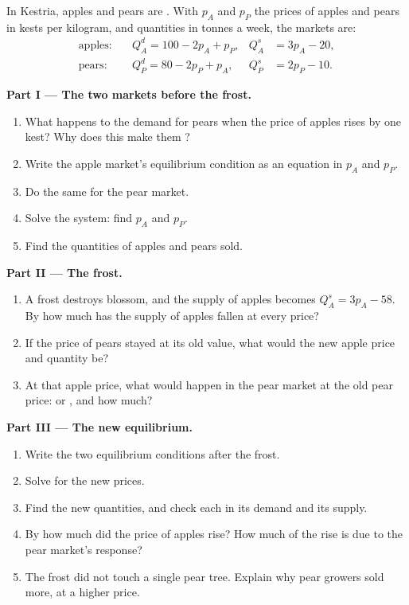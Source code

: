 \begin{problem}
\label{pb:g10:market-equilibrium:1}
In Kestria, apples and pears are . With $p_A$ and $p_P$ the prices of apples and pears in kests per kilogram, and quantities in
tonnes a week, the markets are:
\[
\begin{aligned}
  \text{apples:}\quad & Q^d_A = 100 - 2p_A + p_P, & Q^s_A &= 3p_A - 20, \\
  \text{pears:}\quad  & Q^d_P = 80 - 2p_P + p_A,  & Q^s_P &= 2p_P - 10 .
\end{aligned}
\]

\medskip
\noindent\textbf{Part I --- The two markets before the frost.}
\begin{enumerate}
\item What happens to the demand for pears when the price of apples rises by one kest? Why does this make them ?
\item Write the apple market's equilibrium condition as an equation in $p_A$ and $p_P$.
\item Do the same for the pear market.
\item Solve the system: find $p_A$ and $p_P$.
\item Find the quantities of apples and pears sold.
\end{enumerate}

\medskip
\noindent\textbf{Part II --- The frost.}
\begin{enumerate}[resume]
\item A frost destroys blossom, and the supply of apples becomes $Q^s_A = 3p_A - 58$. By how much has the supply of apples fallen at every price?
\item If the price of pears stayed at its old value, what would the new apple price and quantity be?
\item At that apple price, what would happen in the pear market at the old pear price:  or , and how much?
\end{enumerate}

\medskip
\noindent\textbf{Part III --- The new equilibrium.}
\begin{enumerate}[resume]
\item Write the two equilibrium conditions after the frost.
\item Solve for the new prices.
\item Find the new quantities, and check each in its demand and its supply.
\item By how much did the price of apples rise? How much of the rise is due to the pear market's response?
\item The frost did not touch a single pear tree. Explain why pear growers sold more, at a higher price.
\end{enumerate}


\end{problem}
